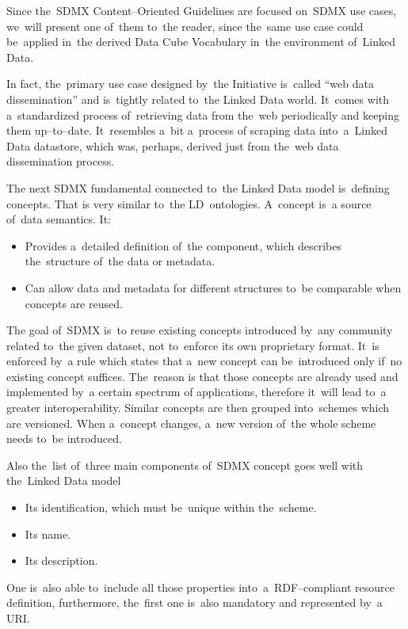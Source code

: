 Since the~SDMX Content--Oriented Guidelines are focused on~SDMX use cases, we~will present
one of~them to~the reader, since the~same use case could be~applied in~the derived Data Cube
Vocabulary in~the environment of~Linked Data.

In fact, the~primary use case designed by~the Initiative is~called “web data dissemination”
and is~tightly related to~the Linked Data world. It~comes with a~standardized process of~retrieving
data from the~web periodically and keeping them up--to--date. It~resembles a~bit a~process
of scraping data into~a~Linked Data datastore, which was, perhaps, derived just from the~web
data dissemination process.

The next SDMX fundamental connected to~the Linked Data model is~defining concepts. That is
very similar to~the LD~ontologies. A~concept is~a source of~data semantics. It:

\begin{itemize}
\item Provides a~detailed definition of~the component, which describes the~structure of~the data or
metadata.
\item Can allow data and metadata for different structures to~be comparable when concepts are reused.
\end{itemize}

The goal of~SDMX is~to reuse existing concepts introduced by~any community related to~the
given dataset, not to~enforce its own proprietary format. It~is enforced by~a rule which states
that a~new concept can be~introduced only if~no existing concept suffices. The~reason
is that those concepts are already used and implemented by~a certain spectrum of
applications, therefore it~will lead to~a greater interoperability. Similar concepts are then
grouped into~schemes which are versioned. When a~concept changes, a~new version of~the
whole scheme needs to~be introduced.

Also the~list of~three main components of~SDMX concept goes well with the~Linked Data model

\begin{itemize}
\item Its identification, which must be~unique within the~scheme.
\item Its name.
\item Its description.
\end{itemize}

One is~also able to~include all those properties into~a~RDF--compliant resource definition,
furthermore, the~first one is~also mandatory and represented by~a URI.


